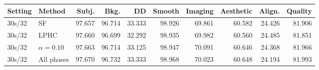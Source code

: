 \begin{tabular}{llrrrrrrrr}
\toprule
Setting & Method & Subj. & Bkg. & DD & Smooth & Imaging & Aesthetic & Align. & Quality \\
\midrule
30s/32 & SF & 97.657 & 96.714 & 33.333 & 98.926 & 69.861 & 60.582 & 24.426 & 81.906 \\
30s/32 & LPHC & 97.660 & 96.699 & 32.292 & 98.935 & 69.982 & 60.560 & 24.485 & 81.851 \\
30s/32 & $\alpha=0.10$ & 97.663 & 96.714 & 33.125 & 98.947 & 70.091 & 60.646 & 24.368 & 81.966 \\
30s/32 & All phases & 97.670 & 96.732 & 33.333 & 98.968 & 70.023 & 60.648 & 24.194 & 81.993 \\
\bottomrule
\end{tabular}
